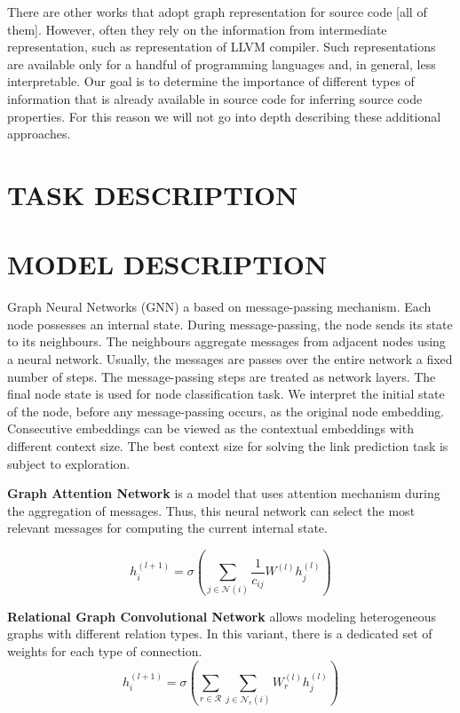 \documentclass[a4paper,twoside]{article}
\begin{document}
There are other works that adopt graph representation for source code [all of them]. However, often they rely on the information from intermediate representation, such as representation of LLVM compiler. Such representations are available only for a handful of programming languages and, in general, less interpretable. Our goal is to determine the importance of different types of information that is already available in source code for inferring source code properties. For this reason we will not go into depth describing these additional approaches. 

\section{\uppercase{Task Description}}

\section{\uppercase{Model Description}}

Graph Neural Networks (GNN) a based on message-passing mechanism. Each node possesses an internal state. During message-passing, the node sends its state to its neighbours. The neighbours aggregate messages from adjacent nodes using a neural network. Usually, the messages are passes over the entire network a fixed number of steps. The message-passing steps are treated as network layers. The final node state is used for node classification task. We interpret the initial state of the node, before any message-passing occurs, as the original node embedding. Consecutive embeddings can be viewed as the contextual embeddings with different context size. The best context size for solving the link prediction task is subject to exploration.

\textbf{Graph Attention Network} is a model that uses attention mechanism during the aggregation of messages. Thus, this neural network can select the most relevant messages for computing the current internal state.

$$
h_i^{(l+1)}=\sigma\left(\sum_{j\in \mathcal{N}(i)} {\frac{1}{c_{ij}} W^{(l)}h^{(l)}_j}\right)
$$

\textbf{Relational Graph Convolutional Network} allows modeling heterogeneous graphs with different relation types. In this variant, there is a dedicated set of weights for each type of connection. 
$$
h_i^{(l+1)} = \sigma\left(\sum_{r\in \mathcal{R}}
\sum_{j\in\mathcal{N}_r(i)}W_r^{(l)}h_j^{(l)}\right)
$$
\end{document}
